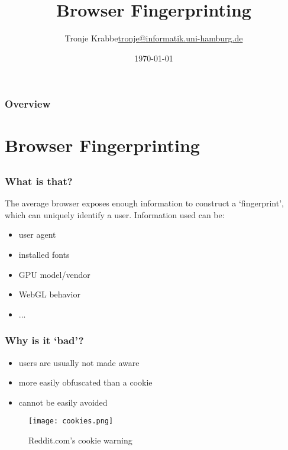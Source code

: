 \documentclass{beamer}
\title[BSc Thesis]{Browser Fingerprinting}
\author[Tronje Krabbe]{Tronje Krabbe\newline\url{tronje@informatik.uni-hamburg.de}}
\institute[UHH]
{
Uni Hamburg \\
Working Group on Security and Privacy\\
}
\date{\today}
\begin{document}
\begin{frame}
\titlepage
\end{frame}

\begin{frame}
\frametitle{Overview}
\tableofcontents
\end{frame}



\section{Browser Fingerprinting}

\subsection{}


\begin{frame}
    \frametitle{What is that?}
    The average browser exposes enough information to construct
    a `fingerprint', which can uniquely identify a user. Information used can be:
    \begin{itemize}
        \item user agent
        \item installed fonts
        \item GPU model/vendor
        \item WebGL behavior
        \item ...
    \end{itemize}
\end{frame}


\begin{frame}
    \frametitle{Why is it `bad'?}
    \begin{itemize}
        \item users are usually not made aware
        \item more easily obfuscated than a cookie
        \item cannot be easily avoided
    \end{itemize}

    \begin{figure}[h]
    \centering
    \texttt{[image: cookies.png]}
    \caption{Reddit.com's cookie warning}
    \end{figure}

\end{frame}
\end{document}
